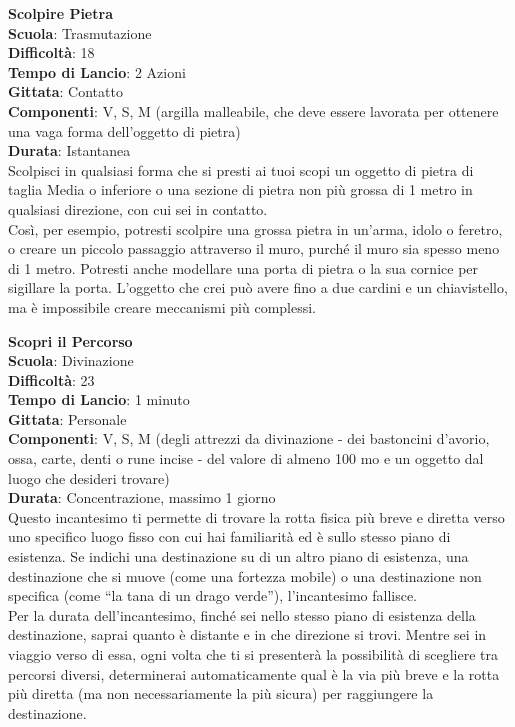 \begin{multicols}{2}
\medskip\textbf{Scolpire Pietra}\\
\textbf{Scuola}: Trasmutazione\\
\textbf{Difficoltà}:  18\\
\textbf{Tempo di Lancio}: 2 Azioni\\
\textbf{Gittata}: Contatto\\
\textbf{Componenti}: V, S, M (argilla malleabile, che deve essere lavorata per ottenere una vaga forma dell'oggetto di pietra)\\
\textbf{Durata}: Istantanea\\
Scolpisci in qualsiasi forma che si presti ai tuoi scopi un oggetto di pietra di taglia Media o inferiore o una sezione di pietra non più grossa di 1 metro in qualsiasi direzione, con cui sei in contatto.\\
Così, per esempio, potresti scolpire una grossa pietra in un'arma, idolo o feretro, o creare un piccolo passaggio attraverso il muro, purché il muro sia spesso meno di 1 metro. Potresti anche modellare una porta di pietra o la sua cornice per sigillare la porta. L’oggetto che crei può avere fino a due cardini e un chiavistello, ma è impossibile creare meccanismi più complessi.

\medskip\textbf{Scopri il Percorso}\\
\textbf{Scuola}: Divinazione\\
\textbf{Difficoltà}:  23\\
\textbf{Tempo di Lancio}: 1 minuto\\
\textbf{Gittata}: Personale\\
\textbf{Componenti}: V, S, M (degli attrezzi da divinazione - dei bastoncini d’avorio, ossa, carte, denti o rune incise - del valore di almeno 100 mo e un oggetto dal luogo che desideri trovare)\\
\textbf{Durata}: Concentrazione, massimo 1 giorno\\
Questo incantesimo ti permette di trovare la rotta fisica più breve e diretta verso uno specifico luogo fisso con cui hai familiarità ed è sullo stesso piano di esistenza. Se indichi una destinazione su di un altro piano di esistenza, una destinazione che si muove (come una  fortezza mobile) o una destinazione non specifica (come “la tana di un drago verde”), l'incantesimo fallisce.\\
Per la durata dell'incantesimo, finché sei nello stesso piano di esistenza della destinazione, saprai quanto è distante e in che direzione si trovi. Mentre sei in viaggio verso di essa, ogni volta che ti si presenterà la possibilità di scegliere tra percorsi diversi, determinerai automaticamente qual è la via più breve e la rotta più diretta (ma non necessariamente la più sicura) per raggiungere la destinazione. 


\end{multicols}

